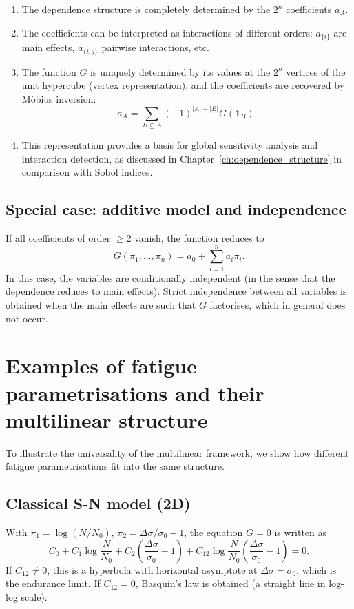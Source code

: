 \begin{enumerate}
    \item The dependence structure is completely determined by the \(2^n\) coefficients \(a_A\).
    \item The coefficients can be interpreted as interactions of different orders: \(a_{\{i\}}\) are main effects, \(a_{\{i,j\}}\) pairwise interactions, etc.
    \item The function \(G\) is uniquely determined by its values at the \(2^n\) vertices of the unit hypercube (vertex representation), and the coefficients are recovered by Möbius inversion:
    \[
    a_A = \sum_{B\subseteq A} (-1)^{|A|-|B|} G(\mathbf{1}_B).
    \]
    \item This representation provides a basis for global sensitivity analysis and interaction detection, as discussed in Chapter~\ref{ch:dependence_structure} in comparison with Sobol indices.
\end{enumerate}

\subsection{Special case: additive model and independence}

If all coefficients of order \(\ge2\) vanish, the function reduces to
\[
G(\pi_1,\ldots,\pi_n) = a_0 + \sum_{i=1}^n a_i\pi_i.
\]
In this case, the variables are conditionally independent (in the sense that the dependence reduces to main effects). Strict independence between all variables is obtained when the main effects are such that \(G\) factorises, which in general does not occur.

\section{Examples of fatigue parametrisations and their multilinear structure}
\label{sec:examples-parametrizations}

To illustrate the universality of the multilinear framework, we show how different fatigue parametrisations fit into the same structure.

\subsection{Classical S-N model (2D)}

With \(\pi_1 = \log(N/N_0)\), \(\pi_2 = \Delta\sigma/\sigma_0 - 1\), the equation \(G=0\) is written as
\[
C_0 + C_1\log\frac{N}{N_0} + C_2\left(\frac{\Delta\sigma}{\sigma_0}-1\right) + C_{12}\log\frac{N}{N_0}\left(\frac{\Delta\sigma}{\sigma_0}-1\right) = 0.
\]
If \(C_{12}\neq0\), this is a hyperbola with horizontal asymptote at \(\Delta\sigma=\sigma_0\), which is the endurance limit. If \(C_{12}=0\), Basquin's law is obtained (a straight line in log-log scale).

